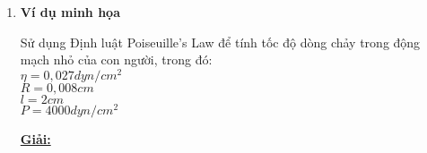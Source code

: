 \documentclass[12pt,a4paper]{article}
\begin{document}
\begin{enumerate} [a/]
\begin{flushleft}
		      Trong đó : \begin{enumerate}
			      \item [+]  $\eta $ là độ nhớt của máu
			      \item [+]  P là độ chênh lệch áp suất giữa 2 đầu ống
			            Nếu P và l không đổi thì v là hàm của r có miền [0;R]
		      \end{enumerate}
		      Chia bán kính R thành các bán kính nhỏ hơn có độ dài như nhau là $\Delta R$, diện tích gần đúngcủa vòng có bán kính trong $r_{i-1}$ và bán kính ngoài $r_i$ (như hình vẽ) là: $2\pi r_i \Delta r$ với $\Delta r= r_i-r_{i-1}$\\
		      Với $\Delta r$ rất bé thì vận tốc máu gần như không đổi gần bằng v(r).
		      Thể tích máu chảy qua trong 1 đơn vị thời gian xấp xỉ là:
		      $$(2\pi r, \Delta r)v(r_i)=2\pi r_iv(r_i)\Delta r$$
		      \\
		      Bằng quy tắc tổng Riemann, tổng thể tích máu chảy qua một mặt cắt của một mạch máu trong một đơn vị thời gian là:
		      $$\sum_{i=1}^n2\pi r_iv(r_i)\Delta r$$
		      \\
		      Khi $n \to \infty $ , tổng thể tích máu đi qua mặt cắt của một mạch máu trong một đơn vị thời gian (Kí hiệu: F) là:
		      $$F=\int_0^R 2\pi rv(r)dr$$
		      $$=\int_0^R 2\pi r\frac{P}{4\eta l}(R^2-r^2)$$
		      $$=\frac{\pi P}{2\eta l}\int_0^R (R^2r -r^3)dr= \frac{\pi P}{2\eta l}[R^2\frac{r^2}{2}-\frac{r^4}{4}]|_{r=0}^{r=R}$$
		      $$=\frac{\pi P}{2\eta l}[\frac{R^4}{2}-\frac{R^2}{4}]=\frac{\pi PR^4}{8\eta l}$$
		      \\
		      Biểu thức trên được gọi là định luật Poiseuille’s Law
	      \end{flushleft}
	\item \textbf{Ví dụ minh họa}
	      \begin{flushleft}
		      Sử dụng Định luật Poiseuille’s Law để tính tốc độ dòng chảy trong động mạch nhỏ của con người, trong đó:
		      \\
		      $\eta = 0,027 dyn/cm^2$
		      \\
		      $R= 0,008 cm$
		      \\
		      $l= 2 cm$
		      \\
		      $P= 4000 dyn/cm^2$
	      \end{flushleft}
	      \begin{center}
		      \textbf{\underline{Giải:}}
	      \end{center}
	      \begin{flushleft}

\end{flushleft}
\end{enumerate}
\end{document}
